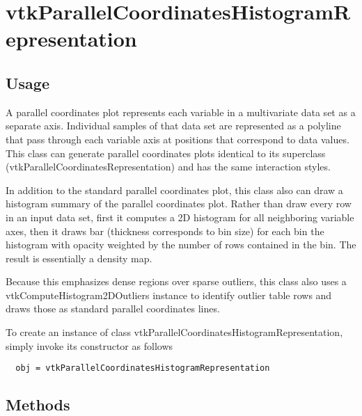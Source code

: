 \section{vtkParallelCoordinatesHistogramRepresentation}

\subsection{Usage}

  A parallel coordinates plot represents each variable in a multivariate
  data set as a separate axis.  Individual samples of that data set are
  represented as a polyline that pass through each variable axis at 
  positions that correspond to data values.  This class can generate
  parallel coordinates plots identical to its superclass 
  (vtkParallelCoordinatesRepresentation) and has the same interaction
  styles.

  In addition to the standard parallel coordinates plot, this class also
  can draw a histogram summary of the parallel coordinates plot.  
  Rather than draw every row in an input data set, first it computes
  a 2D histogram for all neighboring variable axes, then it draws
  bar (thickness corresponds to bin size) for each bin the histogram
  with opacity weighted by the number of rows contained in the bin.
  The result is essentially a density map.  

  Because this emphasizes dense regions over sparse outliers, this class
  also uses a vtkComputeHistogram2DOutliers instance to identify outlier
  table rows and draws those as standard parallel coordinates lines.


To create an instance of class vtkParallelCoordinatesHistogramRepresentation, simply
invoke its constructor as follows
\begin{verbatim}
  obj = vtkParallelCoordinatesHistogramRepresentation
\end{verbatim}
\subsection{Methods}

